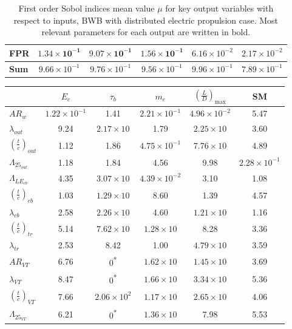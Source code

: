 \begin{table}[!h]
\begin{tabular}{l c c c c c}
		FPR & $\mathbf{1.34\times10^{-1}}$ & $\mathbf{9.07\times10^{-1}}$ & $\mathbf{1.56\times10^{-1}}$ & $6.16\times10^{-2}$ & $2.17\times10^{-2}$ \\
		\hline
		\textbf{Sum} & $9.66\times10^{-1}$ & $9.76\times10^{-1}$ & $9.56\times10^{-1}$ & $9.96\times10^{-1}$ & $7.89\times10^{-1}$ \\
		\hline
	\end{tabular}
	\caption{First order Sobol indices mean value $\mu$ for key output variables with respect to inputs, BWB with distributed electric propulsion case. 
		Most relevant parameters for each output are written in bold.}
	\label{tab:bwb_hybrid_dep_sens_an_geom_sobol}
\end{table}
\begin{table}[!h]
	\centering
	\begin{tabular}{l c c c c c}
		\hline
		& $E_{c}$ & $\tau_{b}$ & $m_e$ & $\left(\frac{L}{D}\right)_{\max}$ & SM \\
		\hline
		$AR_w$ & $1.22\times10^{-1}$ & 1.41 & $2.21\times10^{-1}$ & $4.96\times10^{-2}$ & 5.47 \\
		$\lambda_{out}$ & 9.24 & $2.17\times10$ & 1.79 & $2.25\times10$ & 3.60 \\
		$\left(\frac{t}{c}\right)_{out}$ & 1.12 & 1.86 & $4.75\times10^{-1}$ & $7.76\times10$ & 4.89 \\
		$\Lambda_{25_{out}}$ & 1.18 & 1.84 & 4.56 & 9.98 & $2.28\times10^{-1}$ \\
		
		$\Lambda_{LE_{cb}}$ & 4.35 & $3.07\times10$ & $4.39\times10^{-2}$ & 3.10 & 1.08 \\
		$\left(\frac{t}{c}\right)_{cb}$ & 1.03 & $1.29\times10$ & 8.60 & 1.39 & 4.57 \\
		$\lambda_{cb}$ & 2.58 & $2.26\times10$ & 4.60 & $1.21\times10$ & 1.16 \\
		$\left(\frac{t}{c}\right)_{tr}$ & 5.14 & $7.62\times10$ & $1.28\times10$ & 8.28 & 3.36 \\
		$\lambda_{tr}$ & 2.53 & 8.42 & 1.00 & $4.79\times10$ & 3.59 \\
		
		$AR_{VT}$ & 6.76 & 0\textsuperscript{*} & $1.62\times10$ & $1.45\times10$ & 3.69 \\
		$\lambda_{VT}$ & 8.47 & 0\textsuperscript{*} & $1.66\times10$ & $3.34\times10$ & 5.36 \\
		$\left(\frac{t}{c}\right)_{VT}$ & 7.66 & $2.06\times10^{2}$ & $1.17\times10$ & $2.65\times10$ & 4.06 \\
		$\Lambda_{25_{VT}}$ & 6.21 & 0\textsuperscript{*} & $1.36\times10$ & 7.98 & 5.53 \\
		

\end{tabular}
\end{table}
